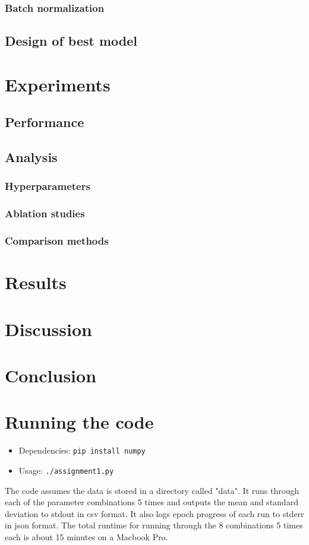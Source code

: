 \documentclass{article}
\begin{document}
\subsubsection{Batch normalization}
\subsection{Design of best model}

\section{Experiments}
\subsection{Performance}
\subsection{Analysis}
\subsubsection{Hyperparameters}
\subsubsection{Ablation studies}
\subsubsection{Comparison methods}

\section{Results}

\section{Discussion}

\section{Conclusion}

\appendix
\section{Running the code}
\begin{itemize}
\item Dependencies: \texttt{pip install numpy}
\item Usage: \texttt{./assignment1.py}
\end{itemize}
The code assumes the data is stored in a directory called "data". It runs through each of the parameter combinations 5 times and outputs the mean and standard deviation to stdout in csv format. It also logs epoch progress of each run to stderr in json format. The total runtime for running through the 8 combinations 5 times each is about 15 minutes on a Macbook Pro.
\end{document}
